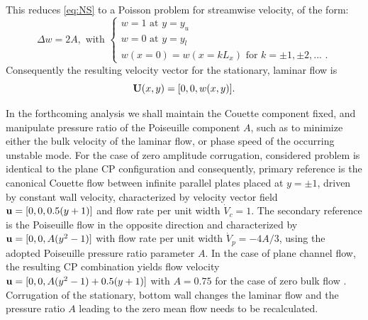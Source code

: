 \documentclass[lineno]{jfm}
\begin{document}
This reduces \eqref{eq:NS} to a Poisson problem for streamwise velocity, of the form:
\begin{equation}
    \Delta w = 2A,
    \text{ with }
    \begin{cases}
    w=1\text{ at }y=y_{u}\\
    w=0\text{ at }y=y_{l}\\
    w(x=0)=w(x=kL_x) \text{ for } k=\pm1,\pm2, \text{... .}
    \end{cases}
    \label{eq:poiss}
\end{equation}
Consequently the resulting velocity vector for the stationary, laminar flow is \begin{equation}
    {\bf U}(x,y) = [0, 0, w(x,y)].
    \label{eq:laminar_solution}
\end{equation}

In the forthcoming analysis we shall maintain the Couette component fixed, and manipulate pressure ratio of the Poiseuille component $A$, such as to minimize either the bulk velocity of the laminar flow, or phase speed of the occurring unstable mode.
For the case of zero amplitude corrugation, considered problem is identical to the plane CP configuration
and consequently, primary reference is the canonical Couette flow between infinite parallel plates placed at $y=\pm1$, driven by constant wall velocity, characterized by velocity vector field ${\bf u} = [0,0, 0.5(y+1)]$ and flow rate per unit width $\Dot{V}_c=1$.
The secondary reference is the Poiseuille flow in the opposite direction and characterized by ${\bf u} = [0,0, A(y^2-1)]$ with flow rate per unit width $\Dot{V}_p=-4A/3$, using the adopted Poiseuille pressure ratio parameter $A$.
In the case of plane channel flow, the resulting CP combination yields flow velocity ${\bf u} = [0, 0, A(y^2-1)+0.5(y+1)]$ with $A=0.75$ for the case of zero bulk flow \citep{Klotz_2017_prf, mohammadi2014effects}.
Corrugation of the stationary, bottom wall changes the laminar flow and the pressure ratio $A$ leading to the zero mean flow needs to be recalculated.
\end{document}
